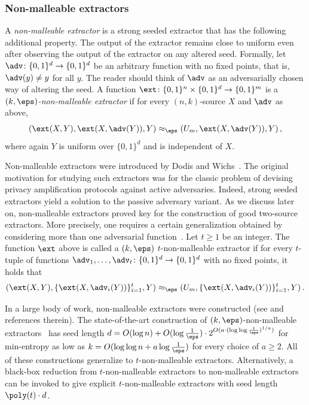 %
%
\subsubsection{Non-malleable extractors}
%
A \emph{non-malleable extractor} is a strong seeded extractor that has the following additional property. The output of the extractor remains close to uniform even after observing the output of the extractor on any altered seed. Formally, let $\adv \colon \{0,1\}^d \to \{0,1\}^d$ be an arbitrary function with no fixed points, that is, $\adv(y) \neq y$ for all $y$. The reader should think of $\adv$ as an adversarially chosen way of altering the seed. A function $\ext \colon \{0,1\}^n \times \{0,1\}^d \to \{0,1\}^m$ is a \emph{$(k,\eps)$-non-malleable extractor} if for every $(n,k)$-source $X$ and $\adv$ as above,
\begin{equation}\label{eq:nmext}
(\ext(X,Y),\ext(X,\adv(Y)),Y) \approx_\eps (U_m, \ext(X,\adv(Y)),Y)\,,
\end{equation}
where again $Y$ is uniform over $\{0,1\}^d$ and is independent of $X$. %



Non-malleable extractors were introduced by Dodis and Wichs~\cite{DW09}. The original motivation for studying such extractors %
was  %
for the classic problem of devising privacy amplification protocols against active adversaries. Indeed, strong seeded extractors yield a solution to the passive adversary variant. As we discuss later on, non-malleable extractors proved key for the construction of good two-source extractors. More precisely, one requires a certain generalization obtained by considering more than one adversarial function~\cite{CRS12}. Let $t \ge 1$ be an integer. The function $\ext$ above is called a $(k,\eps)$ $t$-non-malleable extractor if for every $t$-tuple of functions $\adv_1,\ldots,\adv_t \colon \{0,1\}^d \to \{0,1\}^d$ with no fixed points, it holds that
\[
(\ext(X,Y),\{\ext(X,\adv_i(Y))\}_{i=1}^{t},Y) \approx_\eps (U_m, \{\ext(X,\adv_i(Y))\}_{i=1}^{t},Y)\,.
\]

In a %
large body of work,
non-malleable extractors were constructed (see \cite{DLWTZ11,CRS12,Li15,Cohen16b,CGL16,Cohen16d,CS16,CL16,Cohen16c,Li17} and references therein). The state-of-the-art construction of $(k,\eps)$-non-malleable extractors~\cite{Li19} has seed length $d = O(\log{n})+ O(\log\frac1{\eps}) \cdot 2^{O(a \cdot (\log\log\frac1{\eps})^{1/a})}$ for min-entropy as low as $k = O(\log\log{n} + a \log\frac1{\eps})$ for every choice of $a \ge 2$. All of these constructions generalize to $t$-non-malleable extractors. Alternatively, a black-box reduction from $t$-non-malleable extractors to non-malleable extractors~\cite{Cohen16d} can be invoked to give explicit $t$-non-malleable extractors with seed length $\poly(t) \cdot d$.

